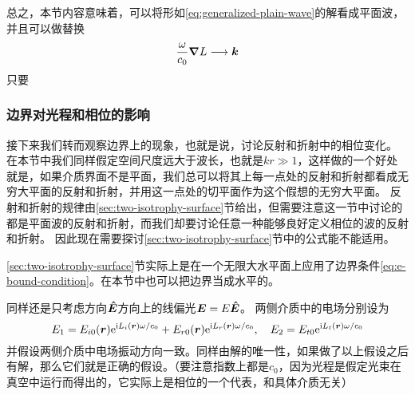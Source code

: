 \documentclass[UTF8, a4paper]{ctexart}
\newcommand*{\ii}{\mathrm{i}}
\newcommand*{\ee}{\mathrm{e}}
\begin{document}
总之，本节内容意味着，可以将形如\eqref{eq:generalized-plain-wave}的解看成平面波，并且可以做替换
\begin{equation}
    \frac{\omega}{c_0} \grad{L} \longrightarrow \vb*{k}
    \label{eq:generalized-k}
\end{equation}
只要

\subsubsection{边界对光程和相位的影响}

接下来我们转而观察边界上的现象，也就是说，讨论反射和折射中的相位变化。
在本节中我们同样假定空间尺度远大于波长，也就是$kr \gg 1$，这样做的一个好处就是，如果介质界面不是平面，我们总可以将其上每一点处的反射和折射都看成无穷大平面的反射和折射，并用这一点处的切平面作为这个假想的无穷大平面。
反射和折射的规律由\ref{sec:two-isotrophy-surface}节给出，但需要注意这一节中讨论的都是平面波的反射和折射，而我们却要讨论任意一种能够良好定义相位的波的反射和折射。
因此现在需要探讨\ref{sec:two-isotrophy-surface}节中的公式能不能适用。

\ref{sec:two-isotrophy-surface}节实际上是在一个无限大水平面上应用了边界条件\eqref{eq:e-bound-condition}。在本节中也可以把边界当成水平的。

同样还是只考虑方向$\vu*{E}$方向上的线偏光$\vb*{E} = E \vu*{E}$。
两侧介质中的电场分别设为
\[
    E_1 = E_{i0}(\vb*{r}) \ee^{\ii L_i(\vb*{r}) \omega / c_0} + E_{r0}(\vb*{r}) \ee^{\ii L_r(\vb*{r}) \omega / c_0}, \quad E_2 = E_{t0} \ee^{\ii L_t(\vb*{r}) \omega / c_0}
\]
并假设两侧介质中电场振动方向一致。同样由解的唯一性，如果做了以上假设之后有解，那么它们就是正确的假设。（要注意指数上都是$c_0$，因为光程是假定光束在真空中运行而得出的，它实际上是相位的一个代表，和具体介质无关）
\end{document}
